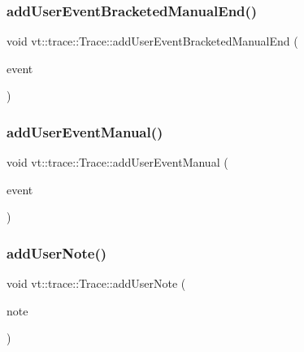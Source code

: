 \mbox{\label{structvt_1_1trace_1_1_trace_a5de97038ac60bfcdf868c3f32637ef9e}} 
\subsubsection{\texorpdfstring{add\+User\+Event\+Bracketed\+Manual\+End()}{addUserEventBracketedManualEnd()}}
{\footnotesize\ttfamily void vt\+::trace\+::\+Trace\+::add\+User\+Event\+Bracketed\+Manual\+End (\begin{DoxyParamCaption}\item[{\hyperlink{namespacevt_1_1trace_a70c43e0e1596eea236912d4197d3120a}{User\+Spec\+Event\+I\+D\+Type}}]{event }\end{DoxyParamCaption})}

\mbox{\label{structvt_1_1trace_1_1_trace_a2d9fac6bd71ba67e4f87b7efd7c6c6c7}} 
\subsubsection{\texorpdfstring{add\+User\+Event\+Manual()}{addUserEventManual()}}
{\footnotesize\ttfamily void vt\+::trace\+::\+Trace\+::add\+User\+Event\+Manual (\begin{DoxyParamCaption}\item[{\hyperlink{namespacevt_1_1trace_a70c43e0e1596eea236912d4197d3120a}{User\+Spec\+Event\+I\+D\+Type}}]{event }\end{DoxyParamCaption})}

\mbox{\label{structvt_1_1trace_1_1_trace_a8be5309a84a6d0f99df0eb835fedf3b1}} 
\subsubsection{\texorpdfstring{add\+User\+Note()}{addUserNote()}}
{\footnotesize\ttfamily void vt\+::trace\+::\+Trace\+::add\+User\+Note (\begin{DoxyParamCaption}\item[{std\+::string const \&}]{note }\end{DoxyParamCaption})}

